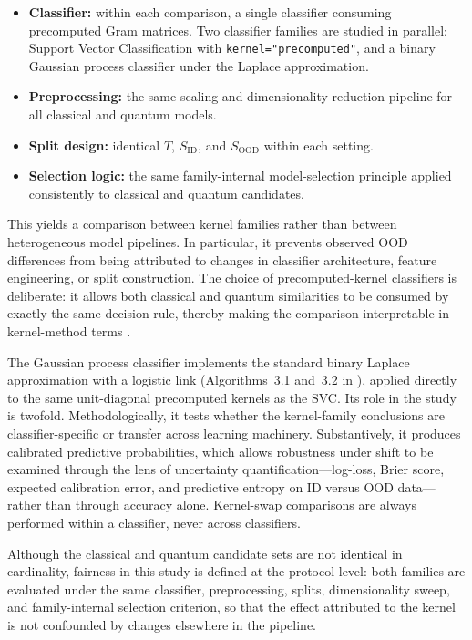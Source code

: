 \documentclass[journal]{IEEEtran}
\begin{document}
\begin{itemize}
    \item \textbf{Classifier:} within each comparison, a single classifier consuming precomputed Gram matrices. Two classifier families are studied in parallel: Support Vector Classification with \texttt{kernel="precomputed"}, and a binary Gaussian process classifier under the Laplace approximation.
    \item \textbf{Preprocessing:} the same scaling and dimensionality-reduction pipeline for all classical and quantum models.
    \item \textbf{Split design:} identical $T$, $S_{\mathrm{ID}}$, and $S_{\mathrm{OOD}}$ within each setting.
    \item \textbf{Selection logic:} the same family-internal model-selection principle applied consistently to classical and quantum candidates.
\end{itemize}

This yields a comparison between kernel families rather than between heterogeneous model pipelines. In particular, it prevents observed OOD differences from being attributed to changes in classifier architecture, feature engineering, or split construction. The choice of precomputed-kernel classifiers is deliberate: it allows both classical and quantum similarities to be consumed by exactly the same decision rule, thereby making the comparison interpretable in kernel-method terms \cite{cortes1995svm,scholkopf2002learningwithkernels}.

The Gaussian process classifier implements the standard binary Laplace approximation with a logistic link (Algorithms~3.1 and~3.2 in \cite{rasmussen2006gpml}), applied directly to the same unit-diagonal precomputed kernels as the SVC. Its role in the study is twofold. Methodologically, it tests whether the kernel-family conclusions are classifier-specific or transfer across learning machinery. Substantively, it produces calibrated predictive probabilities, which allows robustness under shift to be examined through the lens of uncertainty quantification---log-loss, Brier score, expected calibration error, and predictive entropy on ID versus OOD data---rather than through accuracy alone. Kernel-swap comparisons are always performed within a classifier, never across classifiers.

Although the classical and quantum candidate sets are not identical in cardinality, fairness in this study is defined at the protocol level: both families are evaluated under the same classifier, preprocessing, splits, dimensionality sweep, and family-internal selection criterion, so that the effect attributed to the kernel is not confounded by changes elsewhere in the pipeline.
\end{document}

